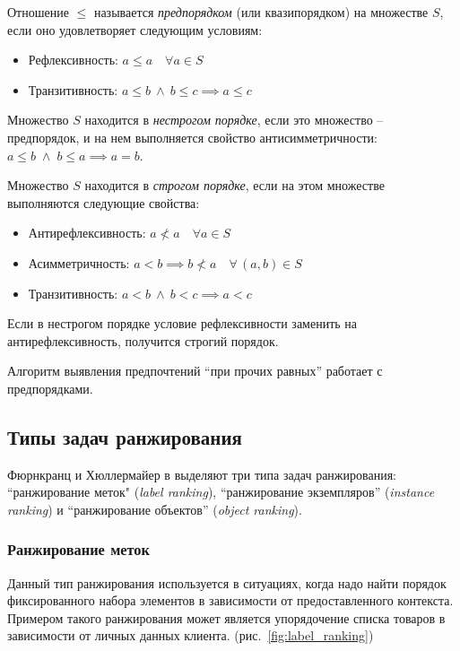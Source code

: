 	\begin{definition}
	\label{def:preorder}
		Отношение $\leq$ называется \emph{предпорядком} (или квазипорядком) на множестве $S$, если оно удовлетворяет следующим условиям\cite{harel:2000}:
		\begin{itemize}[itemsep=-1.5mm]
			\item Рефлексивность: $a \leq a \quad \forall a \in S$
			\item Транзитивность: $a \leq b\: \wedge\: b \leq c \implies a \leq c$ 
		\end{itemize}
	\end{definition}	
	\begin{definition}
	\label{def:nonstrict_order}
		Множество $S$ находится в \emph{нестрогом порядке}, если это множество – предпорядок, и на нем выполняется свойство антисимметричности\cite{Skiena:1991}: $a \leq b\; \wedge\; b \leq a \implies a = b$.
	\end{definition}
	\begin{definition}
	\label{def:strict_order}
		Множество $S$ находится в \emph{строгом порядке}, если на этом множестве выполняются следующие свойства\cite{???}:
		\begin{itemize}[itemsep=-1.5mm]
			\item Антирефлексивность: $ a \nless a \quad \forall a \in S$
			\item Асимметричность: $a < b \implies b \nless a \quad \forall \, (a, b) \in S$
			\item Транзитивность: $a < b\: \wedge\: b < c \implies a < c$
		\end{itemize}
		Если в нестрогом порядке условие рефлексивности заменить на антирефлексивность, получится строгий порядок.
	\end{definition}

	 Алгоритм выявления предпочтений \enquote{при прочих равных} работает с предпорядками.

\subsection{Типы задач ранжирования}
	Фюрнкранц и Хюллермайер в \cite{plbook:Introduction:2010} выделяют три типа задач ранжирования: ``ранжирование меток" (\emph{label ranking}), ``ранжирование экземпляров'' (\emph{instance ranking}) и ``ранжирование объектов'' (\emph{object ranking}).
	
	\subsubsection{Ранжирование меток}
		Данный тип ранжирования используется в ситуациях, когда надо найти порядок фиксированного набора элементов в зависимости от предоставленного контекста. Примером такого ранжирования может является упорядочение списка товаров в зависимости от личных данных клиента. (рис.~\ref{fig:label_ranking})
	
